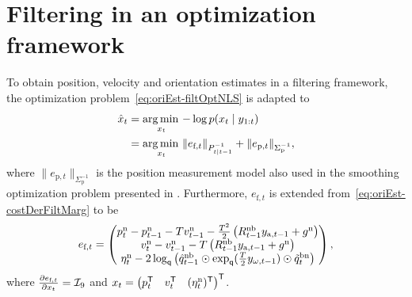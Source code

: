 \section{Filtering in an optimization framework}
To obtain position, velocity and orientation estimates in a filtering framework, the optimization problem~\eqref{eq:oriEst-filtOptNLS} is adapted to
\begin{align}
\hat{x}_t &= \operatorname*{arg \, min \,}_{x_{t}} - \log p(x_{t} \mid y_{1:t}) \nonumber \\
&= \operatorname*{arg \, min \,}_{x_{t}} \| e_{\text{f},t} \|_{P_{t \mid t-1}^{-1}} + \| e_{\text{p},t} \|_{\Sigma_\text{p}^{-1}},
\end{align}
where $\| e_{\text{p},t} \|_{\Sigma_\text{p}^{-1}}$ is the position measurement model also used in the smoothing optimization problem presented in . Furthermore, $e_{\text{f},t}$ is extended from~\eqref{eq:oriEst-costDerFiltMarg} to be 
\begin{align}
e_{\text{f},t} = \begin{pmatrix} p_{t}^\text{n} - p_{t-1}^\text{n} - T v_{t-1}^\text{n} - \tfrac{T^2}{2} \left( R_{t-1}^\text{nb} y_{\text{a},t-1} + g^\text{n} \right) \\
v_{t}^\text{n} - v_{t-1}^\text{n} - T \left( R_{t-1}^\text{nb} y_{\text{a},t-1} + g^\text{n} \right) \\
\eta^\text{n}_{t}- 2 \log_\mathsf{q} \left(\hat{q}_{t-1}^\text{nb} \odot \exp_\mathsf{q} (\tfrac{T}{2} y_{\omega,t-1} ) \odot  \tilde{q}_{t}^\text{bn} \right) \end{pmatrix}, 
\end{align}
where $\tfrac{\partial e_{\text{f},t}}{\partial x_t} = \mathcal{I}_9$ and $x_t = \begin{pmatrix} p_t^{\mathsf{T}} & v_t^{\mathsf{T}} & (\eta^\text{n}_{t})^{\mathsf{T}} \end{pmatrix}^{\mathsf{T}}$.

